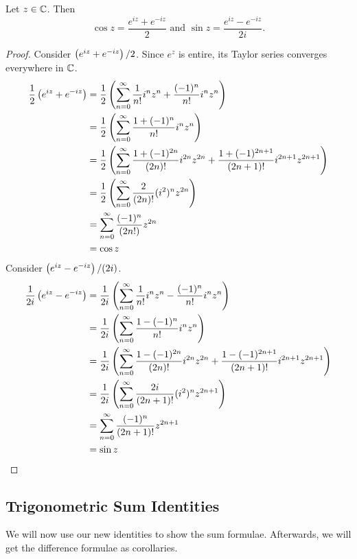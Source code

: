 \documentclass[notitlepage]{problem-solving}
\begin{document}
\begin{proposition}
	Let $z\in\mathbb{C}$.
	Then
	\[
		\cos z = \frac{ e^{iz} + e^{-iz} }{2} \text{ and } \sin z = \frac{ e^{iz} - e^{-iz} }{2i}.
	\]
\end{proposition}
\begin{proof}
	Consider $\left( e^{iz}+e^{-iz} \right)/2$.
	Since $e^z$ is entire, its Taylor series converges everywhere in $\mathbb{C}$.
	\begin{align*}
		\frac{1}{2}\left( e^{iz}+e^{-iz} \right)
		&= \frac{1}{2}\left( \sum_{n=0}^\infty \frac{1}{n!} i^n z^n + \frac{(-1)^n}{n!} i^n z^n \right)\\
		&= \frac{1}{2}\left( \sum_{n=0}^\infty \frac{1+(-1)^n}{n!} i^n z^n \right)\\
		&= \frac{1}{2}\left( \sum_{n=0}^\infty \frac{1+(-1)^{2n}}{(2n)!}i^{2n}z^{2n} + \frac{1+(-1)^{2n+1}}{(2n+1)!}i^{2n+1}z^{2n+1} \right)\\
		&= \frac{1}{2}\left( \sum_{n=0}^\infty \frac{2}{(2n)!}(i^2)^nz^{2n} \right)\\
		&= \sum_{n=0}^\infty \frac{(-1)^n}{(2n!)} z^{2n}\\
		&= \cos z
	\end{align*}
	Consider $\left( e^{iz}-e^{-iz} \right)/(2i)$.
	\begin{align*}
		\frac{1}{2i}\left( e^{iz}-e^{-iz} \right)
		&= \frac{1}{2i}\left( \sum_{n=0}^\infty \frac{1}{n!} i^n z^n - \frac{(-1)^n}{n!} i^n z^n \right)\\
		&= \frac{1}{2i}\left( \sum_{n=0}^\infty \frac{1-(-1)^n}{n!} i^n z^n \right)\\
		&= \frac{1}{2i}\left( \sum_{n=0}^\infty \frac{1-(-1)^{2n}}{(2n)!}i^{2n}z^{2n} + \frac{1-(-1)^{2n+1}}{(2n+1)!}i^{2n+1}z^{2n+1} \right)\\
		&= \frac{1}{2i}\left( \sum_{n=0}^\infty \frac{2i}{(2n+1)!}(i^2)^nz^{2n+1} \right)\\
		&= \sum_{n=0}^\infty \frac{(-1)^n}{(2n+1)!} z^{2n+1}\\
		&= \sin z
	\end{align*}
\end{proof}

\subsection{Trigonometric Sum Identities}

We will now use our new identities to show the sum formulae.
Afterwards, we will get the difference formulae as corollaries.
\end{document}
